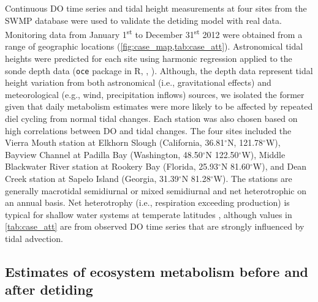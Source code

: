 \documentclass[letterpaper,12pt,oneside]{article}\usepackage[]{graphicx}\usepackage[]{color}
\begin{document}
Continuous \ac{DO} time series and tidal height measurements at four sites from the \ac{SWMP} database  were used to validate the detiding model with real data.  Monitoring data from January 1\textsuperscript{st} to December 31\textsuperscript{st} 2012 were obtained from a range of geographic locations (\cref{fig:case_map,tab:case_att}). Astronomical tidal heights were predicted for each site using harmonic regression applied to the sonde depth data (\texttt{oce} package in R, \citealt{Foreman89}, ). Although, the depth data represent tidal height variation from both astronomical (i.e., gravitational effects) and meteorological (e.g., wind, precipitation inflows) sources, we isolated the former given that daily metabolism estimates were more likely to be affected by repeated diel cycling from normal tidal changes.  Each station was also chosen based on high correlations between \ac{DO} and tidal changes.  The four sites included the Vierra Mouth station at Elkhorn Slough (California, 36.81$^{\circ}$N, 121.78$^{\circ}$W), Bayview Channel at Padilla Bay (Washington, 48.50$^{\circ}$N 122.50$^{\circ}$W), Middle Blackwater River station at Rookery Bay (Florida, 25.93$^{\circ}$N 81.60$^{\circ}$W), and Dean Creek station at Sapelo Island (Georgia, 31.39$^{\circ}$N 81.28$^{\circ}$W).  The stations are generally macrotidal semidiurnal or mixed semidiurnal and net heterotrophic on an annual basis.  Net heterotrophy (i.e., respiration exceeding production) is typical for shallow water systems at temperate latitudes \citep{Caffrey03}, although values in \cref{tab:case_att} are from observed \ac{DO} time series that are strongly influenced by tidal advection.

\subsection{Estimates of ecosystem metabolism before and after detiding} \label{met_sec}
\end{document}
